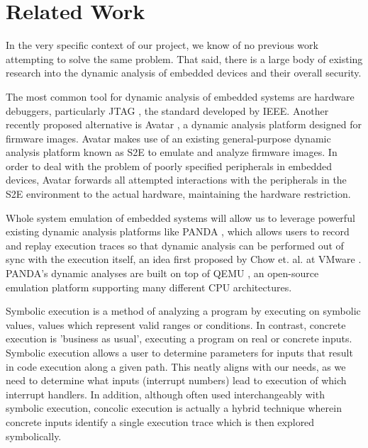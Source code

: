 \documentclass[letterpaper, 10 pt, conference]{ieeeconf}
\begin{document}
\section{Related Work} \label{relatedWork} %
In the very specific context of our project, we know of no previous work attempting to solve the same problem. That said, there is a large body of existing research into the dynamic analysis of embedded devices and their overall security.

The most common tool for dynamic analysis of embedded systems are hardware debuggers, particularly JTAG \cite{jtag}, the standard developed by IEEE. Another recently proposed alternative is Avatar \cite{avatar}, a dynamic analysis platform designed for firmware images. Avatar makes use of an existing general-purpose dynamic analysis platform known as S2E \cite{s2e} to emulate and analyze firmware images. In order to deal with the problem of poorly specified peripherals in embedded devices, Avatar forwards all attempted interactions with the peripherals in the S2E environment to the actual hardware, maintaining the hardware restriction. 

Whole system emulation of embedded systems will allow us to leverage powerful existing dynamic analysis platforms like PANDA \cite{panda}, which allows users to record and replay execution traces so that dynamic analysis can be performed out of sync with the execution itself, an idea first proposed by Chow et. al. at VMware \cite{jchow}. PANDA's dynamic analyses are built on top of QEMU \cite{qemu}, an open-source emulation platform supporting many different CPU architectures. 

Symbolic execution \cite{jking} is a method of analyzing a program by executing on symbolic values, values which represent valid ranges or conditions. In contrast, concrete execution is 'business as usual', executing a program on real or concrete inputs. Symbolic execution allows a user to determine parameters for inputs that result in code execution along a given path. This neatly aligns with our needs, as we need to determine what inputs (interrupt numbers) lead to execution of which interrupt handlers. In addition, although often used interchangeably with symbolic execution, concolic execution \cite{ksen} is actually a hybrid technique wherein concrete inputs identify a single execution trace which is then explored symbolically. 
\end{document}
